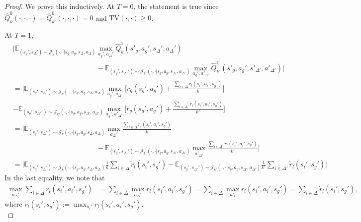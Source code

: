 \documentclass[10pt,a4paper]{amsart}
\def\E{\mathbb{E}}
\begin{document}
\begin{proof}
We prove this inductively. At $T=0$, the statement is true since $\hat{Q}_k^0(\cdot,\cdot,\cdot) = \hat{Q}_{k'}^0(\cdot,\cdot,\cdot) = 0$ and $\mathrm{TV}(\cdot,\cdot)\geq 0$. 

At $T=1$,
\begin{align*}
&\bigg|\E_{(s_g',s_\Delta')\sim\mathcal{J}_k(\cdot,\cdot|s_g,a_g,s_\Delta,a_\Delta)}\max_{a_g',a_\Delta'}\hat{Q}_k^1(s'_g,a_g',s_\Delta',a_\Delta') \\ &\quad\quad\quad\quad\quad\quad\quad\quad\quad\quad\quad\quad- \E_{(s_g',s_{\Delta'}')\sim\mathcal{J}_{k'}(\cdot,\cdot|s_g,a_g,s_{\Delta'}, a_{\Delta'})}\max_{a_g',a'_{\Delta'}}\hat{Q}_{k'}^1(s'_g, a_g',s'_{\Delta'},a'_{\Delta'})\bigg| \\
&=\bigg|\E_{(s_g',s_\Delta')\sim\mathcal{J}_k(\cdot,\cdot|s_g,a_g,s_\Delta,a_\Delta)}\max_{a_g',a_\Delta'}\bigg[r_g(s_g',a_g') + \frac{\sum_{i\in\Delta}r_l(s_i',a_i',s_g')}{k}\bigg] \\
&- \E_{(s_g',s_{\Delta'}')\sim\mathcal{J}_{k'}(\cdot,\cdot|s_g,a_g,s_{\Delta'}, a_{\Delta'})}\max_{a_g',a'_{\Delta'}}\bigg[r_g(s_g',a_g') + \frac{\sum_{i\in\Delta'}r_l(s_i',a_i',s_g')}{k'}\bigg]\bigg|\end{align*}\begin{align*}&= \bigg|\E_{(s_g',s_\Delta')\sim\mathcal{J}_k(\cdot,\cdot|s_g,a_g,s_\Delta,a_\Delta)}\!\max_{a_\Delta'}\frac{\sum_{i\in\Delta}r_l(s_i',a_i',s_g')}{k}\\ &\quad\quad\quad\quad\quad\quad\quad\quad\quad\quad\quad\quad- \E_{(s_g',s_{\Delta'}')\sim\mathcal{J}_{k'}(\cdot,\cdot|s_g,a_g,s_{\Delta'}, a_{\Delta'})}\max_{a'_{\Delta'}}\frac{\sum_{i\in\Delta'}r_l(s_i',a_i',s_g')}{k'}\bigg|\\
&=\bigg|\E_{(s_g',s_\Delta')\sim\mathcal{J}_k(\cdot,\cdot|s_g,a_g,s_\Delta,a_\Delta)}\frac{1}{k}\sum_{i\in\Delta}\tilde{r}_l(s_i',s_g')- \E_{(s_g',s_{\Delta'}')\sim\mathcal{J}_{k'}(\cdot,\cdot|s_g,a_g,s_{\Delta'}, a_{\Delta'})}\frac{1}{k'}\sum_{i\in\Delta'}\tilde{r}_l(s_i',s_g')\bigg|
\end{align*}
In the last equality, we note that \begin{align*}\max_{a_\Delta'}\sum_{i\in\Delta}r_l(s_i',a_i',s_g') &= \sum_{i\in\Delta}\max_{a_\Delta'} r_l(s_i',a_i',s_g') = \sum_{i\in\Delta}\max_{a'_i} r_l(s_i',a_i',s_g') = \sum_{i\in\Delta}\tilde{r}_l(s_i',s_g'),\end{align*}where $\tilde{r}_l(s_i',s_g'):=\max_{a_i'}r_l(s_i',a_i',s_g')$. \\


\end{proof}
\end{document}
